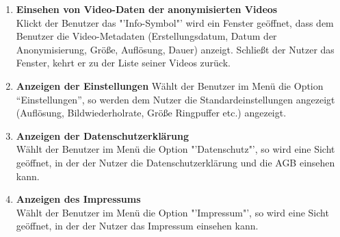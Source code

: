 \begin{enumerate}[\bfseries{FA}10]
\item \textbf{Einsehen von Video-Daten der anonymisierten Videos} \hfill \\
Klickt der Benutzer das "'Info-Symbol"' wird ein Fenster geöffnet, dass dem Benutzer die Video-Metadaten (Erstellungsdatum, Datum der Anonymisierung, Größe, Auflösung, Dauer) anzeigt. Schließt der Nutzer das Fenster, kehrt er zu der Liste seiner Videos zurück.

\item \textbf{Anzeigen der Einstellungen}
Wählt der Benutzer im Menü die Option ``Einstellungen'', so werden dem Nutzer die Standardeinstellungen angezeigt (Auflösung, Bildwiederholrate, Größe Ringpuffer etc.) angezeigt.

\item \textbf{Anzeigen der Datenschutzerklärung} \hfill \\
Wählt der Benutzer im Menü die Option "'Datenschutz"', so wird eine Sicht geöffnet, in der der Nutzer die Datenschutzerklärung und die AGB einsehen kann.

\item \textbf{Anzeigen des Impressums} \hfill \\
Wählt der Benutzer im Menü die Option "'Impressum"', so wird eine Sicht geöffnet, in der der Nutzer das Impressum einsehen kann.

\end{enumerate}

